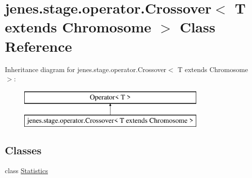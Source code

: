 \hypertarget{classjenes_1_1stage_1_1operator_1_1_crossover_3_01_t_01extends_01_chromosome_01_4}{\section{jenes.\-stage.\-operator.\-Crossover$<$ T extends Chromosome $>$ Class Reference}
\label{classjenes_1_1stage_1_1operator_1_1_crossover_3_01_t_01extends_01_chromosome_01_4}
}
Inheritance diagram for jenes.\-stage.\-operator.\-Crossover$<$ T extends Chromosome $>$\-:\begin{figure}[H]
\begin{center}
\leavevmode
\includegraphics[height=2.000000cm]{classjenes_1_1stage_1_1operator_1_1_crossover_3_01_t_01extends_01_chromosome_01_4}
\end{center}
\end{figure}
\subsection*{Classes}
\begin{DoxyCompactItemize}
\item 
class \hyperlink{classjenes_1_1stage_1_1operator_1_1_crossover_3_01_t_01extends_01_chromosome_01_4_1_1_statistics}{Statistics}
\end{DoxyCompactItemize}
